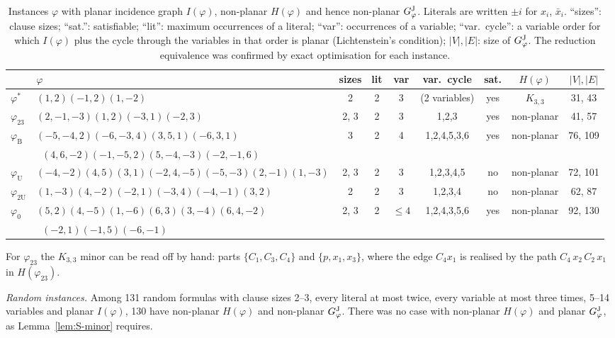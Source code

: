 \documentclass[aps,pre,onecolumn,nofootinbib]{revtex4-2}
\theoremstyle{remark}
\begin{document}
\begin{table}[h]
\caption{Instances $\varphi$ with planar incidence graph $I(\varphi)$, non-planar $H(\varphi)$ and
hence non-planar $G^{\rm J}_\varphi$. Literals are written $\pm i$ for $x_i$, $\bar x_i$. ``sizes'': clause sizes; ``sat.'': satisfiable; ``lit'': maximum
occurrences of a literal; ``var'': occurrences of a variable; ``var.\ cycle'': a variable order for
which $I(\varphi)$ plus the cycle through the variables in that order is planar (Lichtenstein's
condition); $|V|,|E|$: size of $G^{\rm J}_\varphi$. The reduction equivalence was confirmed by exact
optimisation for each instance.}
\label{tab:S-inst}
\begin{ruledtabular}
\begin{tabular}{llccccccc}
& $\varphi$ & sizes & lit & var & var.\ cycle & sat. & $H(\varphi)$ & $|V|,|E|$\\
\hline
$\varphi^*$ & $(1,2)(-1,2)(1,-2)$ & 2 & 2 & 3 & (2 variables) & yes & $K_{3,3}$ & 31, 43\\
$\varphi_{23}$ & $(2,-1,-3)(1,2)(-3,1)(-2,3)$ & 2, 3 & 2 & 3 & 1,2,3 & yes & non-planar & 41, 57\\
$\varphi_{\mathrm B}$ & $(-5,-4,2)(-6,-3,4)(3,5,1)(-6,3,1)$ & 3 & 2 & 4 & 1,2,4,5,3,6 & yes & non-planar & 76, 109\\
 & $\;\;(4,6,-2)(-1,-5,2)(5,-4,-3)(-2,-1,6)$ & & & & & & & \\
$\varphi_{\mathrm U}$ & $(-4,-2)(4,5)(3,1)(-2,4,-5)(-5,-3)(2,-1)(1,-3)$ & 2, 3 & 2 & 3 & 1,2,3,4,5 & no & non-planar & 72, 101\\
$\varphi_{2\mathrm U}$ & $(1,-3)(4,-2)(-2,1)(-3,4)(-4,-1)(3,2)$ & 2 & 2 & 3 & 1,2,3,4 & no & non-planar & 62, 87\\
$\varphi_0$ & $(5,2)(4,-5)(1,-6)(6,3)(3,-4)(6,4,-2)$ & 2, 3 & 2 & $\le4$ & 1,2,4,3,5,6 & yes & non-planar & 92, 130\\
 & $\;\;(-2,1)(-1,5)(-6,-1)$ & & & & & & & \\
\end{tabular}
\end{ruledtabular}
\end{table}

For $\varphi_{23}$ the $K_{3,3}$ minor can be read off by hand: parts $\{C_1,C_3,C_4\}$ and
$\{p,x_1,x_3\}$, where the edge $C_4x_1$ is realised by the path $C_4\,x_2\,C_2\,x_1$ in
$H(\varphi_{23})$.

\emph{Random instances.} Among 131 random formulas with clause sizes 2--3, every literal at most
twice, every variable at most three times, 5--14 variables and planar $I(\varphi)$, 130 have
non-planar $H(\varphi)$ and non-planar $G^{\rm J}_\varphi$. There was no case with non-planar $H(\varphi)$
and planar $G^{\rm J}_\varphi$, as Lemma~\ref{lem:S-minor} requires.
\end{document}
